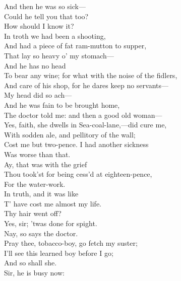 \documentclass[a4paper,oneside]{memoir}
\begin{document}
\begin{drama*}
\facespeaks And then he was so sick---\\
\druggerspeaks {} Could he tell you that too?\\
\facespeaks How should I know it?\\
\druggerspeaks {} In troth we had been a shooting,\\
And had a piece of fat ram-mutton to supper,\\
That lay so heavy o' my stomach---\\
\facespeaks {} And he has no head\\
To bear any wine; for what with the noise of the fidlers,\\
And care of his shop, for he dares keep no servants---\\
\druggerspeaks My head did so ach---\\
\facespeaks {} And he was fain to be brought home,\\
The doctor told me: and then a good old woman---\\
\druggerspeaks Yes, faith, she dwells in Sea-coal-lane,---did cure me,\\
With sodden ale, and pellitory of the wall;\\
Cost me but two-pence. I had another sickness\\
Was worse than that.\\
\facespeaks {} Ay, that was with the grief\\
Thou took'st for being cess'd at eighteen-pence,\\
For the water-work.\\
\druggerspeaks {} In truth, and it was like\\
T' have cost me almost my life.\\
\facespeaks {} Thy hair went off?\\
\druggerspeaks Yes, sir; 'twas done for spight.\\
\facespeaks {} Nay, so says the doctor.\\
\kastrilspeaks Pray thee, tobacco-boy, go fetch my suster;\\
I'll see this learned boy before I go;\\
And so shall she.\\
\facespeaks {} Sir, he is busy now:\\

\end{drama*}
\end{document}
